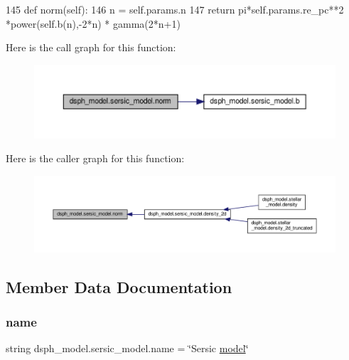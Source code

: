 \begin{DoxyCode}
145     \textcolor{keyword}{def }norm(self):
146         n = self.params.n
147         \textcolor{keywordflow}{return} pi*self.params.re\_pc**2 *power(self.b(n),-2*n) * gamma(2*n+1)
\end{DoxyCode}
Here is the call graph for this function\+:\nopagebreak
\begin{figure}[H]
\begin{center}
\leavevmode
\includegraphics[width=350pt]{d0/de9/classdsph__model_1_1sersic__model_a9af6c3cabf132205c55129bc28b9d867_cgraph}
\end{center}
\end{figure}
Here is the caller graph for this function\+:\nopagebreak
\begin{figure}[H]
\begin{center}
\leavevmode
\includegraphics[width=350pt]{d0/de9/classdsph__model_1_1sersic__model_a9af6c3cabf132205c55129bc28b9d867_icgraph}
\end{center}
\end{figure}


\subsection{Member Data Documentation}
\mbox{\label{classdsph__model_1_1sersic__model_ab2173ac383d967b9b3ebbb71dde7ed8a}} 
\subsubsection{\texorpdfstring{name}{name}}
{\footnotesize\ttfamily string dsph\+\_\+model.\+sersic\+\_\+model.\+name = \char`\"{}Sersic \hyperlink{classdsph__model_1_1model}{model}\char`\"{}\hspace{0.3cm}{\ttfamily [static]}}



